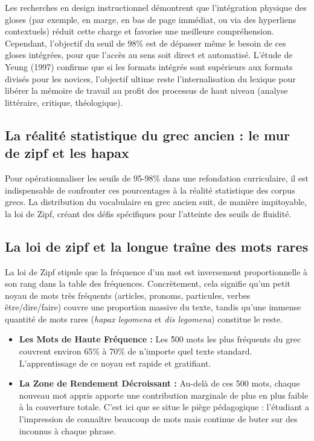 {Les recherches en design instructionnel démontrent que l'intégration physique des gloses (par
exemple, en marge, en bas de page immédiat, ou via des hyperliens contextuels) réduit cette charge
et favorise une meilleure compréhension.\cite{III-1-2-ref17} Cependant, l'objectif du seuil de 98\%
est de dépasser même le besoin de ces gloses intégrées, pour que l'accès au sens soit direct et
automatisé. L'étude de Yeung (1997) confirme que si les formats intégrés sont supérieurs aux formats
divisés pour les novices, l'objectif ultime reste l'internalisation du lexique pour libérer la
mémoire de travail au profit des processus de haut niveau (analyse littéraire, critique,
théologique).\cite{III-1-2-ref17}



\subsection{La réalité statistique du grec ancien : le mur de zipf et les hapax}

Pour opérationnaliser les seuils de 95-98\% dans une refondation curriculaire, il est indispensable
de confronter ces pourcentages à la réalité statistique des corpus grecs. La distribution du
vocabulaire en grec ancien suit, de manière impitoyable, la loi de Zipf, créant des défis
spécifiques pour l'atteinte des seuils de fluidité.



\subsection{La loi de zipf et la longue traîne des mots rares}

La loi de Zipf stipule que la fréquence d'un mot est inversement proportionnelle à son rang dans la
table des fréquences. Concrètement, cela signifie qu'un petit noyau de mots très fréquents
(articles, pronoms, particules, verbes être/dire/faire) couvre une proportion massive du texte,
tandis qu'une immense quantité de mots rares (\textit{hapax legomena} et \textit{dis legomena})
constitue le reste.\cite{III-1-2-ref24}

\begin{itemize}\item \textbf{Les Mots de Haute Fréquence :} Les \~500 mots les plus fréquents du grec couvrent environ 65\% à 70\% de n'importe quel texte standard.\cite{III-1-2-ref27} L'apprentissage de ce noyau est rapide et gratifiant.\item \textbf{La Zone de Rendement Décroissant :} Au-delà de ces 500 mots, chaque nouveau mot appris apporte une contribution marginale de plus en plus faible à la couverture totale. C'est ici que se situe le piège pédagogique : l'étudiant a l'impression de connaître \og beaucoup de mots\fg{} mais continue de buter sur des inconnus à chaque phrase.\cite{III-1-2-ref29}\end{itemize}

}
